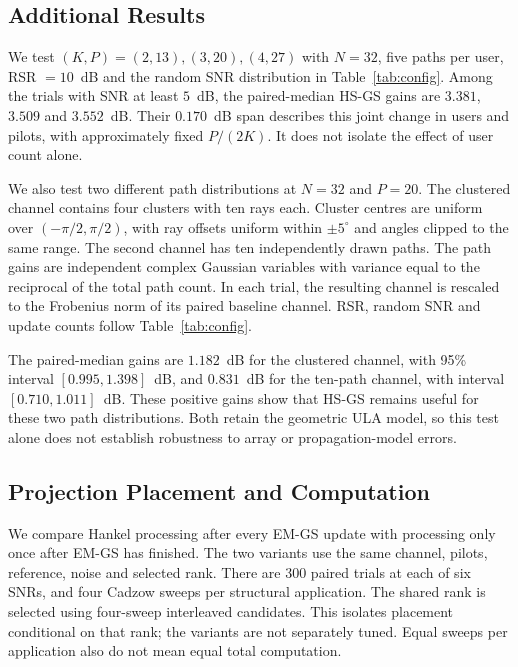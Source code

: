 \documentclass[journal]{IEEEtran}
\begin{document}
\subsection{Additional Results}
\label{sec:kinv}

We test $(K,P)=(2,13),(3,20),(4,27)$ with $N=32$, five paths per user,
RSR $=10$~dB and the random SNR distribution in Table~\ref{tab:config}.
Among the trials with SNR at least $5$~dB, the paired-median HS-GS gains
are $3.381$, $3.509$ and $3.552$~dB. Their $0.170$~dB span describes
this joint change in users and pilots, with approximately fixed $P/(2K)$.
It does not isolate the effect of user count alone.

We also test two different path distributions at $N=32$ and $P=20$.
The clustered channel contains four clusters with ten rays each. Cluster
centres are uniform over $(-\pi/2,\pi/2)$, with ray offsets uniform within
$\pm5^\circ$ and angles clipped to the same range. The second channel has
ten independently drawn paths. The path gains are independent complex
Gaussian variables with variance equal to the reciprocal of the total
path count. In each trial, the resulting channel is rescaled to the
Frobenius norm of its paired baseline channel. RSR, random SNR and update
counts follow Table~\ref{tab:config}.

The paired-median gains are $1.182$~dB for the clustered channel, with
95\% interval $[0.995,1.398]$~dB, and $0.831$~dB for the ten-path
channel, with interval $[0.710,1.011]$~dB. These positive gains show that
HS-GS remains useful for these two path distributions. Both retain the
geometric ULA model, so this test alone does not establish robustness to
array or propagation-model errors.

\subsection{Projection Placement and Computation}
\label{sec:placement}

We compare Hankel processing after every EM-GS update with processing
only once after EM-GS has finished. The two variants use the same channel,
pilots, reference, noise and selected rank. There are 300 paired trials
at each of six SNRs, and four Cadzow sweeps per structural application.
The shared rank is selected using four-sweep interleaved candidates.
This isolates placement conditional on that rank; the variants are not
separately tuned. Equal sweeps per application also do not mean equal
total computation.
\end{document}
